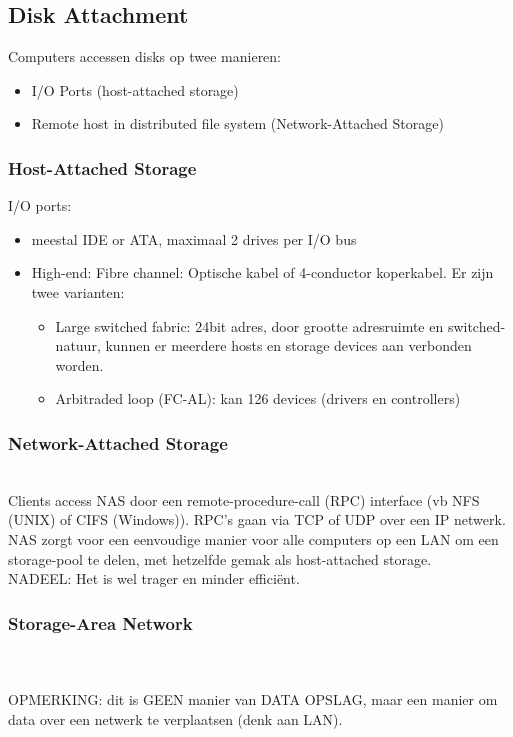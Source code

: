 \subsection{Disk Attachment}
Computers accessen disks op twee manieren:
\begin{itemize}
	\item I/O Ports (host-attached storage)
	\item Remote host in distributed file system (Network-Attached Storage)
\end{itemize}
\subsubsection{Host-Attached Storage}
I/O ports:
\begin{itemize}
	\item meestal IDE or ATA, maximaal 2 drives per I/O bus
	\item High-end: Fibre channel: Optische kabel of 4-conductor koperkabel. Er zijn twee varianten:
	\begin{itemize}
		\item Large switched fabric: 24bit adres, door grootte adresruimte en switched-natuur, kunnen er meerdere hosts en storage devices aan verbonden worden.
		\item Arbitraded loop (FC-AL): kan 126 devices (drivers en controllers)
	\end{itemize}
\end{itemize}
\subsubsection{Network-Attached Storage}
 \\ Clients access NAS door een remote-procedure-call (RPC) interface (vb NFS (UNIX) of CIFS (Windows)). RPC's gaan via TCP of UDP over een IP netwerk. \\ NAS zorgt voor een eenvoudige manier voor alle computers op een LAN om een storage-pool te delen, met hetzelfde gemak als host-attached storage. \\ NADEEL: Het is wel trager en minder effici\"{e}nt.
\subsubsection{Storage-Area Network}
 \\ \hfill \\OPMERKING: dit is GEEN manier van DATA OPSLAG, maar een manier om data over een netwerk te verplaatsen (denk aan LAN).
